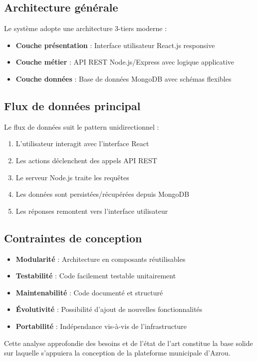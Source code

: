 \subsection{Architecture générale}

Le système adopte une architecture 3-tiers moderne :

\begin{itemize}
\item \textbf{Couche présentation} : Interface utilisateur React.js responsive
\item \textbf{Couche métier} : API REST Node.js/Express avec logique applicative
\item \textbf{Couche données} : Base de données MongoDB avec schémas flexibles
\end{itemize}

\subsection{Flux de données principal}

Le flux de données suit le pattern unidirectionnel :
\begin{enumerate}
\item L'utilisateur interagit avec l'interface React
\item Les actions déclenchent des appels API REST
\item Le serveur Node.js traite les requêtes
\item Les données sont persistées/récupérées depuis MongoDB
\item Les réponses remontent vers l'interface utilisateur
\end{enumerate}

\subsection{Contraintes de conception}

\begin{itemize}
\item \textbf{Modularité} : Architecture en composants réutilisables
\item \textbf{Testabilité} : Code facilement testable unitairement
\item \textbf{Maintenabilité} : Code documenté et structuré
\item \textbf{Évolutivité} : Possibilité d'ajout de nouvelles fonctionnalités
\item \textbf{Portabilité} : Indépendance vis-à-vis de l'infrastructure
\end{itemize}

Cette analyse approfondie des besoins et de l'état de l'art constitue la base solide sur laquelle s'appuiera la conception de la plateforme municipale d'Azrou.
